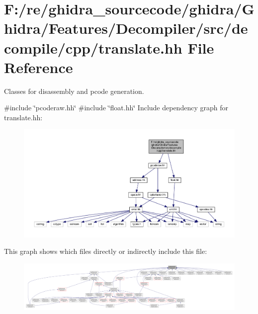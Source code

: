 \hypertarget{translate_8hh}{}\section{F\+:/re/ghidra\+\_\+sourcecode/ghidra/\+Ghidra/\+Features/\+Decompiler/src/decompile/cpp/translate.hh File Reference}
\label{translate_8hh}


Classes for disassembly and pcode generation.  


{\ttfamily \#include \char`\"{}pcoderaw.\+hh\char`\"{}}\newline
{\ttfamily \#include \char`\"{}float.\+hh\char`\"{}}\newline
Include dependency graph for translate.\+hh\+:
\nopagebreak
\begin{figure}[H]
\begin{center}
\leavevmode
\includegraphics[width=350pt]{translate_8hh__incl}
\end{center}
\end{figure}
This graph shows which files directly or indirectly include this file\+:
\nopagebreak
\begin{figure}[H]
\begin{center}
\leavevmode
\includegraphics[width=350pt]{translate_8hh__dep__incl}
\end{center}
\end{figure}

